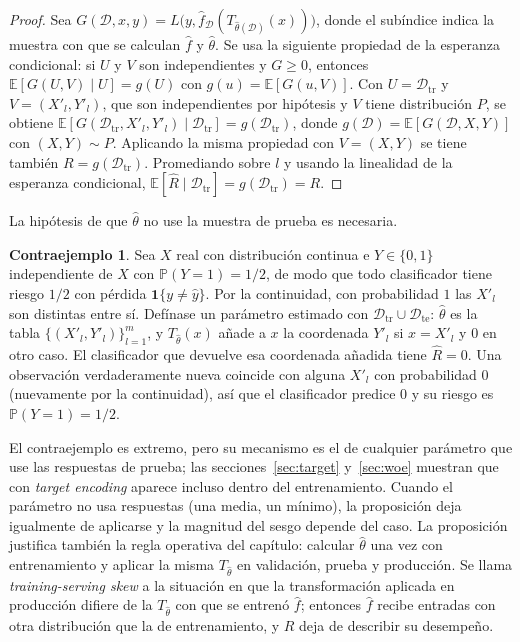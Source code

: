 \documentclass[11pt,a4paper]{article}
\theoremstyle{plain}
\theoremstyle{definition}
\newtheorem{contraejemplo}[teorema]{Contraejemplo}
\theoremstyle{remark}
\newcommand{\E}{\mathbb{E}}
\newcommand{\Prob}{\mathbb{P}}
\newcommand{\1}{\mathbf{1}}
\newcommand{\ind}[1]{\mathbf{1}\{#1\}}
\newcommand{\Dtr}{\mathcal D_{\mathrm{tr}}}
\newcommand{\Dte}{\mathcal D_{\mathrm{te}}}
\begin{document}
\begin{proof}
Sea $G(\mathcal D,x,y)=L\bigl(y,\hat f_{\mathcal D}(T_{\hat\theta(\mathcal
D)}(x))\bigr)$, donde el subíndice indica la muestra con que se calculan
$\hat f$ y $\hat\theta$. Se usa la siguiente propiedad de la esperanza
condicional: si $U$ y $V$ son independientes y $G\ge0$, entonces
$\E[G(U,V)\mid U]=g(U)$ con $g(u)=\E[G(u,V)]$. Con $U=\Dtr$ y
$V=(X'_l,Y'_l)$, que son independientes por hipótesis y $V$ tiene
distribución $P$, se obtiene
$\E[G(\Dtr,X'_l,Y'_l)\mid\Dtr]=g(\Dtr)$, donde
$g(\mathcal D)=\E[G(\mathcal D,X,Y)]$ con $(X,Y)\sim P$. Aplicando la misma
propiedad con $V=(X,Y)$ se tiene también $R=g(\Dtr)$. Promediando sobre
$l$ y usando la linealidad de la esperanza condicional,
$\E[\hat R\mid\Dtr]=g(\Dtr)=R$.
\end{proof}

La hipótesis de que $\hat\theta$ no use la muestra de prueba es necesaria.

\begin{contraejemplo}\label{ce:fuga}
Sea $X$ real con distribución continua e $Y\in\{0,1\}$ independiente de
$X$ con $\Prob(Y=1)=1/2$, de modo que todo clasificador tiene riesgo $1/2$
con pérdida $\ind{y\neq\hat y}$. Por la continuidad, con probabilidad $1$
las $X'_l$ son distintas entre sí. Defínase un parámetro
estimado con $\Dtr\cup\Dte$: $\hat\theta$ es la tabla
$\{(X'_l,Y'_l)\}_{l=1}^m$, y $T_{\hat\theta}(x)$ añade a $x$ la
coordenada $Y'_l$ si $x=X'_l$ y $0$ en otro caso. El clasificador que
devuelve esa coordenada añadida tiene $\hat R=0$. Una observación
verdaderamente nueva coincide con alguna $X'_l$ con probabilidad $0$
(nuevamente por la continuidad), así que el clasificador predice $0$ y su
riesgo es $\Prob(Y=1)=1/2$.
\end{contraejemplo}

El contraejemplo es extremo, pero su mecanismo es el de cualquier
parámetro que use las respuestas de prueba; las
secciones~\ref{sec:target} y~\ref{sec:woe} muestran que con
\emph{target encoding} aparece incluso dentro del entrenamiento. Cuando el
parámetro no usa respuestas (una media, un mínimo), la proposición deja
igualmente de aplicarse y la magnitud del sesgo depende del caso. La
proposición justifica también la regla operativa del capítulo: calcular
$\hat\theta$ una vez con entrenamiento y aplicar la misma
$T_{\hat\theta}$ en validación, prueba y producción. Se llama
\emph{training-serving skew} a la situación en que la transformación
aplicada en producción difiere de la $T_{\hat\theta}$ con que se entrenó
$\hat f$; entonces $\hat f$ recibe entradas con otra distribución que la de
entrenamiento, y $R$ deja de describir su desempeño.
\end{document}
